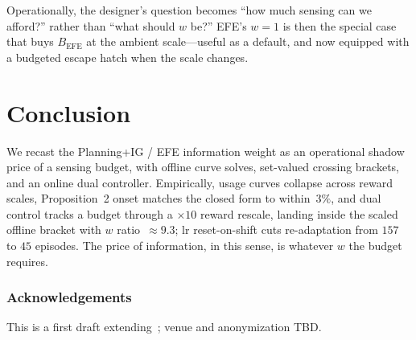 \documentclass[runningheads]{llncs}
\begin{document}
Operationally, the designer's question becomes ``how much sensing can we afford?'' rather than ``what should $w$ be?'' EFE's $w{=}1$ is then the special case that buys $B_{\mathrm{EFE}}$ at the ambient scale---useful as a default, and now equipped with a budgeted escape hatch when the scale changes.

\section{Conclusion}

We recast the Planning+IG / EFE information weight as an operational shadow price of a sensing budget, with offline curve solves, set-valued crossing brackets, and an online dual controller. Empirically, usage curves collapse across reward scales, Proposition~2 onset matches the closed form to within~$3\%$, and dual control tracks a budget through a $\times 10$ reward rescale, landing inside the scaled offline bracket with $w$ ratio~$\approx 9.3$; lr reset-on-shift cuts re-adaptation from $157$ to $45$ episodes. The price of information, in this sense, is whatever $w$ the budget requires.

\subsubsection*{Acknowledgements}
This is a first draft extending~\citep{cooper2026efe}; venue and anonymization TBD.
\end{document}
